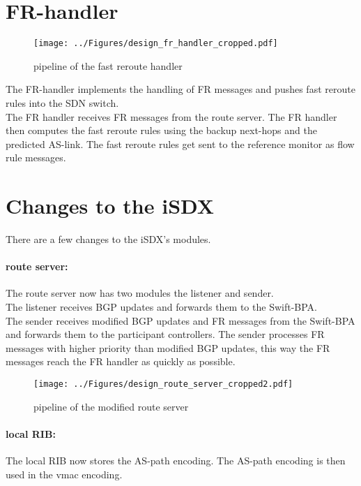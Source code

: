 \section{\label{chapter3:FR-handler}FR-handler}

\begin{figure}[h]
\center
\texttt{[image: ../Figures/design\_fr\_handler\_cropped.pdf]}
\caption{pipeline of the fast reroute handler}
\end{figure}

The FR-handler implements the handling of FR messages and pushes fast reroute rules into the SDN switch. \\
The FR handler receives FR messages from the route server. The FR handler then computes the fast reroute rules using the backup next-hops and the predicted AS-link. The fast reroute rules get sent to the reference monitor as flow rule messages.  

\newpage

\section{\label{chapter3:Changes to the iSDX}Changes to the iSDX}

There are a few changes to the iSDX's modules. 

\paragraph{\label{chapter3:Changes to the iSDX:route server}route server:}

The route server now has two modules the listener and sender. \\
The listener receives BGP updates and forwards them to the Swift-BPA. \\
The sender receives modified BGP updates and FR messages from the Swift-BPA and forwards them to the participant controllers. The sender processes FR messages with higher priority than modified BGP updates, this way the FR messages reach the FR handler as quickly as possible. 

\begin{figure}[h]
\center
\texttt{[image: ../Figures/design\_route\_server\_cropped2.pdf]}
\caption{pipeline of the modified route server}
\end{figure}


\paragraph{\label{chapter3:Changes to the iSDX:local RIB}local RIB:}
The local RIB now stores the AS-path encoding. The AS-path encoding is then used in the vmac encoding. 

